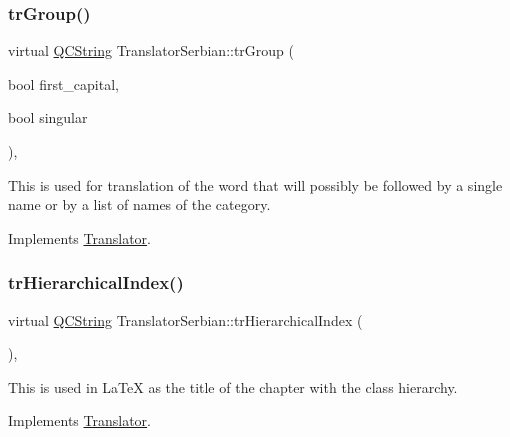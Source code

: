 \mbox{\label{class_translator_serbian_a5266e88a507920e98812038495b6c8c9}} 
\subsubsection{\texorpdfstring{trGroup()}{trGroup()}}
{\footnotesize\ttfamily virtual \mbox{\hyperlink{class_q_c_string}{Q\+C\+String}} Translator\+Serbian\+::tr\+Group (\begin{DoxyParamCaption}\item[{bool}]{first\+\_\+capital,  }\item[{bool}]{singular }\end{DoxyParamCaption})\hspace{0.3cm}{\ttfamily [inline]}, {\ttfamily [virtual]}}

This is used for translation of the word that will possibly be followed by a single name or by a list of names of the category. 

Implements \mbox{\hyperlink{class_translator}{Translator}}.

\mbox{\label{class_translator_serbian_ac6c2e6d4c229ac61fd4b6db3da88ad24}} 
\subsubsection{\texorpdfstring{trHierarchicalIndex()}{trHierarchicalIndex()}}
{\footnotesize\ttfamily virtual \mbox{\hyperlink{class_q_c_string}{Q\+C\+String}} Translator\+Serbian\+::tr\+Hierarchical\+Index (\begin{DoxyParamCaption}{ }\end{DoxyParamCaption})\hspace{0.3cm}{\ttfamily [inline]}, {\ttfamily [virtual]}}

This is used in La\+TeX as the title of the chapter with the class hierarchy. 

Implements \mbox{\hyperlink{class_translator}{Translator}}.

\mbox{\label{class_translator_serbian_a22a952ce8035c1e99dd2e5b03191e43c}} 
